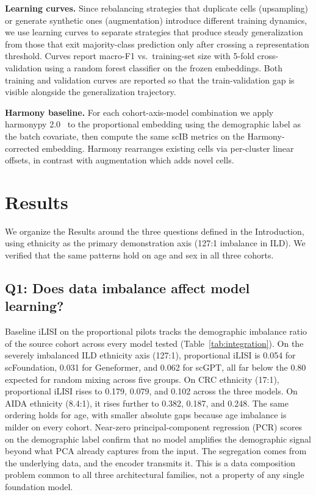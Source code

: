 \documentclass[sigconf]{acmart}
\begin{document}
\textbf{Learning curves.} Since rebalancing strategies that duplicate cells (upsampling) or generate synthetic ones (augmentation) introduce different training dynamics, we use learning curves to separate strategies that produce steady generalization from those that exit majority-class prediction only after crossing a representation threshold. Curves report macro-F1 vs.\ training-set size with 5-fold cross-validation using a random forest classifier on the frozen embeddings. Both training and validation curves are reported so that the train-validation gap is visible alongside the generalization trajectory.

\textbf{Harmony baseline.} For each cohort-axis-model combination we apply harmonypy 2.0~\cite{korsunsky2019fast} to the proportional embedding using the demographic label as the batch covariate, then compute the same scIB metrics on the Harmony-corrected embedding. Harmony rearranges existing cells via per-cluster linear offsets, in contrast with augmentation which adds novel cells.

\section{Results}

We organize the Results around the three questions defined in the Introduction, using ethnicity as the primary demonstration axis (127:1 imbalance in ILD). We verified that the same patterns hold on age and sex in all three cohorts.

\subsection{Q1: Does data imbalance affect model learning?}
\label{sec:q1}

Baseline iLISI on the proportional pilots tracks the demographic imbalance ratio of the source cohort across every model tested (Table~\ref{tab:integration}). On the severely imbalanced ILD ethnicity axis (127:1), proportional iLISI is 0.054 for scFoundation, 0.031 for Geneformer, and 0.062 for scGPT, all far below the 0.80 expected for random mixing across five groups. On CRC ethnicity (17:1), proportional iLISI rises to 0.179, 0.079, and 0.102 across the three models. On AIDA ethnicity (8.4:1), it rises further to 0.382, 0.187, and 0.248. The same ordering holds for age, with smaller absolute gaps because age imbalance is milder on every cohort. Near-zero principal-component regression (PCR) scores on the demographic label confirm that no model amplifies the demographic signal beyond what PCA already captures from the input. The segregation comes from the underlying data, and the encoder transmits it. This is a data composition problem common to all three architectural families, not a property of any single foundation model.
\end{document}
